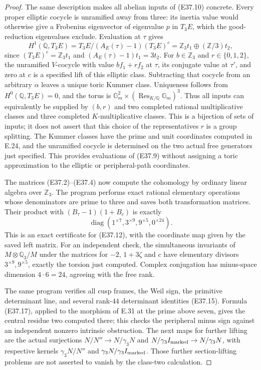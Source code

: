 \begin{proof}
The same description makes all abelian inputs of
(E37.10) concrete. Every proper elliptic cocycle is
unramified away from three: its inertia value would
otherwise give a Frobenius eigenvector of eigenvalue
$p$ in $T_3E$, which the good-reduction eigenvalues
exclude. Evaluation at $\tau$ gives
\[
 H^1(\mathbb Q,T_3E)
  =T_3E/(A_E(\tau)-1)(T_3E)^c
  =\mathbb Z_3t_1\oplus(\mathbb Z/3)t_2,
 \tag{E37.22}
\]
since $(T_3E)^c=\mathbb Z_3t_1$ and
$(A_E(\tau)-1)t_1=3t_2$.
For $b\in\mathbb Z_3$ and $r\in\{0,1,2\}$, the
unramified $V$-cocycle with value $bf_1+rf_2$ at
$\tau$, its conjugate value at $\tau'$, and zero
at $c$ is a specified lift of this elliptic class.
Subtracting that cocycle from an arbitrary $\alpha$
leaves a unique toric Kummer class. Uniqueness follows
from $H^0(\mathbb Q,T_3E)=0$, and the torus is
$\mathbb G_m^2\times(\operatorname{Res}_{K/\mathbb Q}
\mathbb G_m)^3$. Thus all inputs can equivalently
be supplied by $(b,r)$ and two completed rational
multiplicative classes and three completed
$K$-multiplicative classes. This is a bijection of
sets of inputs; it does not assert that this choice
of the representatives $r$ is a group splitting.
The Kummer classes have the prime and unit coordinates
computed in E.24, and the unramified cocycle is
determined on the two actual free generators just
specified. This provides evaluations of (E37.9)
without assigning a toric approximation to the
elliptic or peripheral-path coordinates.

The matrices (E37.2)--(E37.4) now compute the
cohomology by ordinary linear algebra over
$\mathbb Z_3$. The program performs exact rational
elementary operations whose denominators are prime
to three and saves both transformation matrices.
Their product with $(B_\tau-1)(1+B_c)$ is exactly
\[
 \operatorname{diag}(1^{\times7},3^{\times9},
                     9^{\times5},0^{\times24}).
 \tag{E37.21}
\]
This is an exact certificate for (E37.12), with the
coordinate map given by the saved left matrix.
For an independent check, the simultaneous invariants
of $M\otimes\mathbb Q_3/M$ under the matrices for
$-2$, $1+3\zeta$ and $c$ have elementary divisors
$3^{\times9},9^{\times5}$, exactly the torsion just
computed. Complex conjugation has minus-space
dimension $4\cdot6=24$, agreeing with the free rank.

The same program verifies all cusp frames, the Weil
sign, the primitive determinant line, and several
rank-$44$ determinant identities (E37.15). Formula
(E37.17), applied to the morphism of E.31 at the
prime above seven, gives the central residue two
computed there; this checks the peripheral minus
sign against an independent nonzero intrinsic
obstruction. The next maps for further lifting are
the actual surjections
$N/N''\to N/\gamma_3N$ and
$N/\gamma_3I_{\rm marked}\to N/\gamma_3N$,
with respective kernels
$\gamma_3N/N''$ and
$\gamma_3N/\gamma_3I_{\rm marked}$.
Those further section-lifting problems are not
asserted to vanish by the class-two calculation.
\end{proof}
